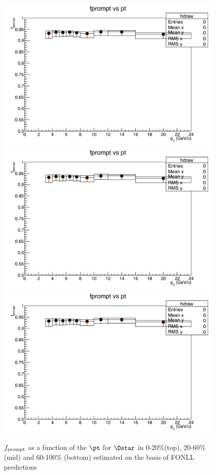 \begin{figure}
\centering
{\includegraphics[width=0.6\linewidth]{figuresVsCent/Dstar/EffAndFeed/fPrompt_020.png}}
{\includegraphics[width=0.6\linewidth]{figuresVsCent/Dstar/EffAndFeed/fPrompt_2060.png}}
{\includegraphics[width=0.6\linewidth]{figuresVsCent/Dstar/EffAndFeed/fPrompt_60100.png}}
\caption{$f_{\rm prompt}$ as a function of the $\pt$ for $\Dstar$ in 0-20$\%$(top), 20-60$\%$ (mid) and 60-100$\%$ (bottom) estimated on the basis of FONLL predictions}
\label{fpromptDstar}
\end{figure}
